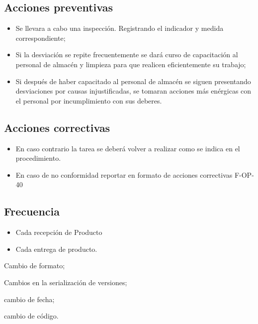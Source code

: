 \subsection{Acciones preventivas}

\begin{itemize}
	\item Se llevara a cabo una inspección. Registrando el indicador y medida correspondiente;
	\item Si la desviación se repite frecuentemente se dará curso de capacitación al personal de almacén y limpieza para que realicen eficientemente su trabajo;
	\item Si después de haber capacitado al personal de almacén se siguen presentando desviaciones por causas injustificadas, se tomaran acciones más enérgicas con el personal por incumplimiento con sus deberes.
\end{itemize}

\subsection{Acciones correctivas}

\begin{itemize}
	\item En caso contrario la tarea se deberá volver a realizar como se indica en el procedimiento.
	\item En caso de no conformidad reportar en formato de acciones correctivas F-OP-40
\end{itemize}

\subsection{Frecuencia}

\begin{itemize}
	\item Cada recepción de Producto
	\item Cada entrega de producto.
\end{itemize}

\begin{changelog}[simple, sectioncmd=\subsection*,label=changelog-2.2]
	
	\begin{version}[v=2.1, date=2023--01, author=Pablo E. Alanis]
			\item Cambio de formato;
			\item Cambios en la serialización de versiones;
	\end{version}

	\begin{version}[v=1.3, date=2022-05, author=Alonso M.]
		\item cambio de fecha;
		\item cambio de código.
	\end{version}

\end{changelog}